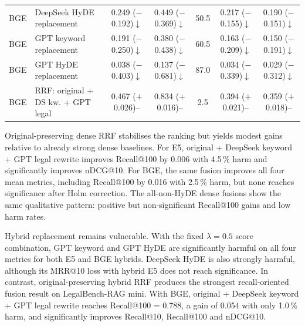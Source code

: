 \documentclass[a4paper,fleqn]{cas-dc}
\begin{document}
\begin{table}[t]
{\begin{tabular}{llccccc}
BGE & DeepSeek HyDE replacement &
0.249 ($-$0.192)$\downarrow$ &
0.449 ($-$0.369)$\downarrow$ &
50.5 &
0.217 ($-$0.155)$\downarrow$ &
0.190 ($-$0.151)$\downarrow$ \\
BGE & GPT keyword replacement &
0.191 ($-$0.250)$\downarrow$ &
0.380 ($-$0.438)$\downarrow$ &
60.5 &
0.163 ($-$0.209)$\downarrow$ &
0.150 ($-$0.191)$\downarrow$ \\
BGE & GPT HyDE replacement &
0.038 ($-$0.403)$\downarrow$ &
0.137 ($-$0.681)$\downarrow$ &
87.0 &
0.034 ($-$0.339)$\downarrow$ &
0.029 ($-$0.312)$\downarrow$ \\
BGE & RRF: original + DS kw. + GPT legal &
0.467 ($+$0.026){--} &
0.834 ($+$0.016){--} &
2.5 &
0.394 ($+$0.021){--} &
0.359 ($+$0.018){--} \\
\bottomrule
\end{tabular}%
}
\end{table}

Original-preserving dense RRF stabilises the ranking but yields
modest gains relative to already strong dense baselines. For E5,
original + DeepSeek keyword + GPT legal rewrite improves
Recall@100 by 0.006 with 4.5\,\% harm and significantly improves
nDCG@10. For BGE, the same fusion improves all four mean metrics,
including Recall@100 by 0.016 with 2.5\,\% harm, but none reaches
significance after Holm correction. The all-non-HyDE dense
fusions show the same qualitative pattern: positive but
non-significant Recall@100 gains and low harm rates.

Hybrid replacement remains vulnerable. With the fixed
$\lambda=0.5$ score combination, GPT keyword and GPT HyDE are
significantly harmful on all four metrics for both E5 and BGE
hybrids. DeepSeek HyDE is also strongly harmful, although its
MRR@10 loss with hybrid E5 does not reach significance. In
contrast, original-preserving hybrid RRF produces the strongest
recall-oriented fusion result on LegalBench-RAG mini. With BGE,
original + DeepSeek keyword + GPT legal rewrite reaches
Recall@100 = 0.788, a gain of 0.054 with only 1.0\,\% harm, and
significantly improves Recall@10, Recall@100 and nDCG@10.
\end{document}
